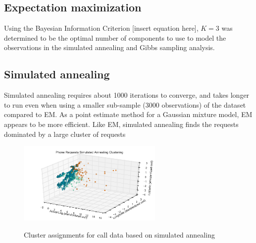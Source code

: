 \documentclass[twoside]{article}
\theoremstyle{theorem}
\theoremstyle{theorem}
\theoremstyle{theorem}
\theoremstyle{lemma}
\theoremstyle{definition}
\theoremstyle{example}
\begin{document}
\subsection{Expectation maximization}
Using the Bayesian Information Criterion [insert equation here], $K = 3$ was determined to be the optimal number of components to use to model the observations in the simulated annealing and Gibbs sampling analysis. 
\subsection{Simulated annealing}
Simulated annealing requires about 1000 iterations to converge, and takes longer to run even when using a smaller sub-sample (3000 observations) of the dataset compared to EM. As a point estimate method for a Gaussian mixture model, EM appears to be more efficient. Like EM, simulated annealing finds the requests dominated by a large cluster of requests 
\begin{figure}
\begin{center}\label{SAcluster}
\includegraphics[width=70mm]{simulated_annealing_clustering}
\caption{Cluster assignments for call data based on simulated annealing}
\label{trace}
\end{center}
\end{figure}
\end{document}
